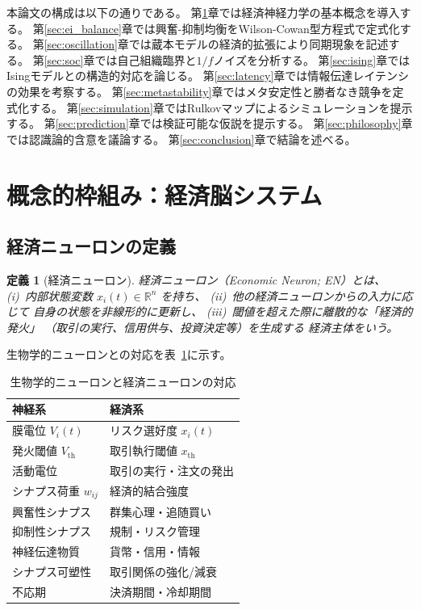 \documentclass[12pt,twocolumn]{ltjsarticle}
\newtheorem{definition}{定義}
\newcommand{\R}{\mathbb{R}}
\begin{document}
本論文の構成は以下の通りである。
第\ref{sec:framework}章では経済神経力学の基本概念を導入する。
第\ref{sec:ei_balance}章では興奮-抑制均衡をWilson-Cowan型方程式で定式化する。
第\ref{sec:oscillation}章では蔵本モデルの経済的拡張により同期現象を記述する。
第\ref{sec:soc}章では自己組織臨界と$1/f$ノイズを分析する。
第\ref{sec:ising}章ではIsingモデルとの構造的対応を論じる。
第\ref{sec:latency}章では情報伝達レイテンシの効果を考察する。
第\ref{sec:metastability}章ではメタ安定性と勝者なき競争を定式化する。
第\ref{sec:simulation}章ではRulkovマップによるシミュレーションを提示する。
第\ref{sec:prediction}章では検証可能な仮説を提示する。
第\ref{sec:philosophy}章では認識論的含意を議論する。
第\ref{sec:conclusion}章で結論を述べる。


\section{概念的枠組み：経済脳システム}
\label{sec:framework}

\subsection{経済ニューロンの定義}

\begin{definition}[経済ニューロン]
\label{def:econeuron}
経済ニューロン（Economic Neuron; EN）とは、
(i)~内部状態変数 $x_i(t) \in \R^n$ を持ち、
(ii)~他の経済ニューロンからの入力に応じて
自身の状態を非線形的に更新し、
(iii)~閾値を超えた際に離散的な「経済的発火」
（取引の実行、信用供与、投資決定等）を生成する
経済主体をいう。
\end{definition}

生物学的ニューロンとの対応を表~\ref{tab:neuron_map}に示す。

\begin{table}[h]
\centering
\caption{生物学的ニューロンと経済ニューロンの対応}
\label{tab:neuron_map}
\begin{tabular}{ll}
\toprule
\textbf{神経系} & \textbf{経済系} \\
\midrule
膜電位 $V_i(t)$ & リスク選好度 $x_i(t)$ \\
発火閾値 $V_{\text{th}}$ & 取引執行閾値 $x_{\text{th}}$ \\
活動電位 & 取引の実行・注文の発出 \\
シナプス荷重 $w_{ij}$ & 経済的結合強度 \\
興奮性シナプス & 群集心理・追随買い \\
抑制性シナプス & 規制・リスク管理 \\
神経伝達物質 & 貨幣・信用・情報 \\
シナプス可塑性 & 取引関係の強化/減衰 \\
不応期 & 決済期間・冷却期間 \\
\bottomrule
\end{tabular}
\end{table}
\end{document}
